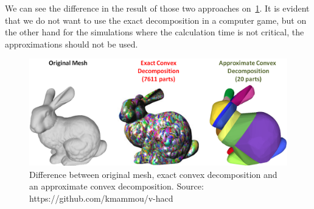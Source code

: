 We can see the difference in the result of those two approaches on~\cref{fig:bunny}. It is evident that we do not want to use the exact decomposition in a computer game, but on the other hand for the simulations where the calculation time is not critical, the approximations should not be used.
\begin{figure}
        \centering
        \includegraphics[width=\textwidth]{img/bunny}
        \caption{Difference between original mesh, exact convex decomposition and an approximate convex decomposition. Source: https://github.com/kmammou/v-hacd}
        \label{fig:bunny}
\end{figure}


